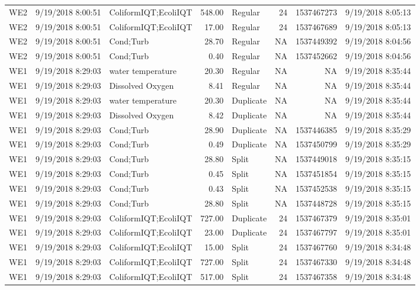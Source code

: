\documentclass[
  letterpaper,
  DIV=11,
  numbers=noendperiod]{scrartcl}
\begin{document}
\begin{longtable*}{lrlrlrrr}
WE2 & 9/19/2018 8:00:51 & ColiformIQT;EcoliIQT & 548.00 & Regular & 24 & 1537467273 & 9/19/2018 8:05:13 \\ 
WE2 & 9/19/2018 8:00:51 & ColiformIQT;EcoliIQT & 17.00 & Regular & 24 & 1537467689 & 9/19/2018 8:05:13 \\ 
WE2 & 9/19/2018 8:00:51 & Cond;Turb & 28.70 & Regular & NA & 1537449392 & 9/19/2018 8:04:56 \\ 
WE2 & 9/19/2018 8:00:51 & Cond;Turb & 0.40 & Regular & NA & 1537452662 & 9/19/2018 8:04:56 \\ 
WE1 & 9/19/2018 8:29:03 & water temperature & 20.30 & Regular & NA & NA & 9/19/2018 8:35:44 \\ 
WE1 & 9/19/2018 8:29:03 & Dissolved Oxygen & 8.41 & Regular & NA & NA & 9/19/2018 8:35:44 \\ 
WE1 & 9/19/2018 8:29:03 & water temperature & 20.30 & Duplicate & NA & NA & 9/19/2018 8:35:44 \\ 
WE1 & 9/19/2018 8:29:03 & Dissolved Oxygen & 8.42 & Duplicate & NA & NA & 9/19/2018 8:35:44 \\ 
WE1 & 9/19/2018 8:29:03 & Cond;Turb & 28.90 & Duplicate & NA & 1537446385 & 9/19/2018 8:35:29 \\ 
WE1 & 9/19/2018 8:29:03 & Cond;Turb & 0.49 & Duplicate & NA & 1537450799 & 9/19/2018 8:35:29 \\ 
WE1 & 9/19/2018 8:29:03 & Cond;Turb & 28.80 & Split & NA & 1537449018 & 9/19/2018 8:35:15 \\ 
WE1 & 9/19/2018 8:29:03 & Cond;Turb & 0.45 & Split & NA & 1537451854 & 9/19/2018 8:35:15 \\ 
WE1 & 9/19/2018 8:29:03 & Cond;Turb & 0.43 & Split & NA & 1537452538 & 9/19/2018 8:35:15 \\ 
WE1 & 9/19/2018 8:29:03 & Cond;Turb & 28.80 & Split & NA & 1537448728 & 9/19/2018 8:35:15 \\ 
WE1 & 9/19/2018 8:29:03 & ColiformIQT;EcoliIQT & 727.00 & Duplicate & 24 & 1537467379 & 9/19/2018 8:35:01 \\ 
WE1 & 9/19/2018 8:29:03 & ColiformIQT;EcoliIQT & 23.00 & Duplicate & 24 & 1537467797 & 9/19/2018 8:35:01 \\ 
WE1 & 9/19/2018 8:29:03 & ColiformIQT;EcoliIQT & 15.00 & Split & 24 & 1537467760 & 9/19/2018 8:34:48 \\ 
WE1 & 9/19/2018 8:29:03 & ColiformIQT;EcoliIQT & 727.00 & Split & 24 & 1537467330 & 9/19/2018 8:34:48 \\ 
WE1 & 9/19/2018 8:29:03 & ColiformIQT;EcoliIQT & 517.00 & Split & 24 & 1537467358 & 9/19/2018 8:34:48 \\ 

\end{longtable*}
\end{document}
